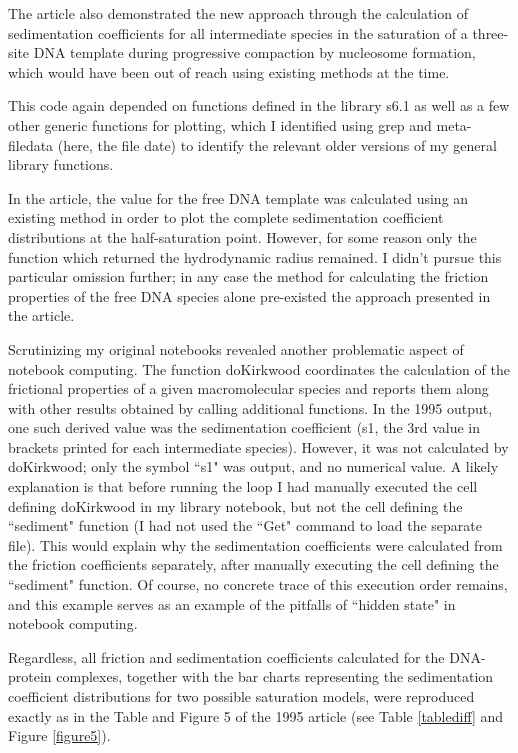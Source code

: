 The article also demonstrated the new approach through the calculation of sedimentation coefficients for all intermediate species in the saturation of a three-site DNA template during progressive compaction by nucleosome formation, which would have been out of reach using existing methods at the time.
 
This code again depended on functions defined in the library s6.1 as well as a few other generic functions for plotting, which I identified using grep and meta-filedata (here, the file date) to identify the relevant older versions of my general library functions.

In the article, the value for the free DNA template was calculated using an existing method in order to plot the complete sedimentation coefficient distributions at the half-saturation point. However, for some reason only the function which returned the hydrodynamic radius remained. I didn't pursue this particular omission further; in any case the method for calculating the friction properties of the free DNA species alone pre-existed the approach presented in the article.

Scrutinizing my original notebooks revealed another problematic aspect of notebook computing. The function doKirkwood coordinates the calculation of the frictional properties of a given macromolecular species and reports them along with other results obtained by calling additional functions. In the 1995 output, one such derived value was the sedimentation coefficient (s1, the 3rd value in brackets printed for each intermediate species). However, it was not calculated by doKirkwood; only the symbol ``s1" was output, and no numerical value. A likely explanation is that before running the loop I had manually executed the cell defining doKirkwood in my library notebook, but not the cell defining the ``sediment" function (I had not used the ``Get" command to load the separate file). This would explain why the sedimentation coefficients were calculated from the friction coefficients separately, after manually executing the cell defining the ``sediment" function. Of course, no concrete trace of this execution order remains, and this example serves as an example of the pitfalls of ``hidden state" in notebook computing.

Regardless, all friction and sedimentation coefficients calculated for the DNA-protein complexes, together with the bar charts representing the sedimentation coefficient distributions for two possible saturation models, were reproduced exactly as in the Table and Figure 5 of the 1995 article (see Table \ref{tablediff} and Figure \ref{figure5}).

